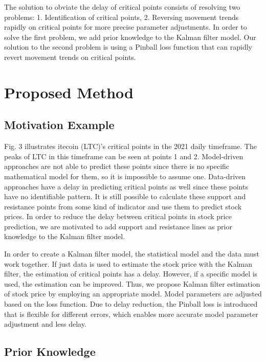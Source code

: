 \documentclass[12pt,a4paper]{article}
\begin{document}
	The solution to obviate the delay of critical points consists of resolving two problems: 1. Identification of critical points, 2. Reversing movement trends rapidly on critical points for more precise parameter adjustments. In order to solve the first problem, we add prior knowledge to the Kalman filter model. Our solution to the second problem is using a Pinball loss function that can rapidly revert movement trends on critical points.
	
	\section{Proposed Method}
	
	\subsection{Motivation Example}
	
	Fig. 3 illustrates itecoin (LTC)'s critical points in the 2021 daily timeframe. The peaks of LTC in this timeframe can be seen at points 1 and 2. Model-driven approaches are not able to predict these points since there is no specific mathematical model for them, so it is impossible to assume one. Data-driven approaches have a delay in predicting critical points as well since these points have no identifiable pattern. It is still possible to calculate these support and resistance points from some kind of indicator and use them to predict stock prices. In order to reduce the delay between critical points in stock price prediction, we are motivated to add support and resistance lines as prior knowledge to the Kalman filter model.
	
	In order to create a Kalman filter model, the statistical model and the data must work together. If just data is used to estimate the stock price with the Kalman filter, the estimation of critical points has a delay. However, if a specific model is used, the estimation can be improved. Thus, we propose Kalman filter estimation of stock price by employing an appropriate model. Model parameters are adjusted based on the loss function. Due to delay reduction, the Pinball loss is introduced that is flexible for different errors, which enables more accurate model parameter adjustment and less delay.
	
	\subsection{Prior Knowledge}
	
\end{document}
